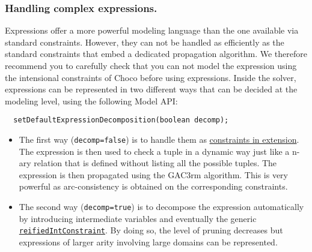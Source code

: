 
	

\subsubsection{Handling complex expressions.}\label{model:handlingcomplexexpressions}\hypertarget{model:handlingcomplexexpressions}{}
Expressions offer a more powerful modeling language than the one available via standard constraints. However, they 
can not be handled as efficiently as the standard constraints that embed a dedicated propagation algorithm. We therefore
recommend you to carefully check that you can not model the expression using the intensional constraints of Choco before using
expressions.
Inside the solver, expressions can be represented in two different ways that can be decided at the modeling level, using the following Model API:
\begin{lstlisting}
  setDefaultExpressionDecomposition(boolean decomp);
\end{lstlisting}
\begin{itemize}
\item The first way (\texttt{decomp=false}) is to handle them as \hyperlink{model:arbitraryconstraintsinextension}{constraints in extension}. The expression is then used to check a tuple in a dynamic way just like a n-ary relation that is defined without listing all the possible tuples. The expression is then propagated using the GAC3rm algorithm. This is very powerful as arc-consistency is obtained on the corresponding constraints.
\item The second way (\texttt{decomp=true}) is to decompose the expression automatically by introducing intermediate variables and eventually the generic \hyperlink{reifiedintconstraint:reifiedintconstraintconstraint}{\tt reifiedIntConstraint}. By doing so, the level of pruning decreases but expressions of larger arity involving large domains can be represented.
\end{itemize}

